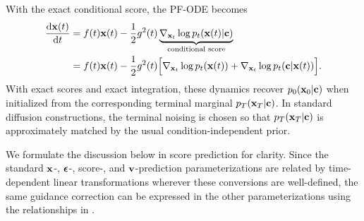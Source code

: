 With the exact conditional score, the PF-ODE becomes
\begin{align}\label{eq:condition_prob_ode}
\begin{aligned}
    \frac{\mathop{}\!\mathrm{d} \mathbf{x}(t)}{\mathop{}\!\mathrm{d} t} &= f(t)\mathbf{x}(t) - \frac{1}{2} g^2(t) \underbrace{\nabla_{{\mathbf{x}}_t} \log p_t({\mathbf{x}}(t) |{\mathbf{c}})}_{\text{conditional score}} \\
    &= f(t)\mathbf{x}(t) - \frac{1}{2} g^2(t) \Big[ \nabla_{{\mathbf{x}}_t} \log p_t({\mathbf{x}}(t)) + \nabla_{{\mathbf{x}}_t} \log p_t({\mathbf{c}} |{\mathbf{x}}(t)) \Big].
\end{aligned}
\end{align}
With exact scores and exact integration, these dynamics recover
$p_0({\mathbf{x}}_0|{\mathbf{c}})$ when initialized from the corresponding terminal marginal
$p_T({\mathbf{x}}_T|{\mathbf{c}})$. In standard diffusion constructions, the terminal noising
is chosen so that $p_T({\mathbf{x}}_T|{\mathbf{c}})$ is approximately matched by the usual
condition-independent prior.

We formulate the discussion below in score prediction for clarity. Since the
standard ${\mathbf{x}}$-, ${\bm{\epsilon}}$-, score-, and ${\mathbf{v}}$-prediction parameterizations are
related by time-dependent linear transformations wherever these conversions are
well-defined, the same guidance correction can be expressed in the other
parameterizations using the relationships in .

